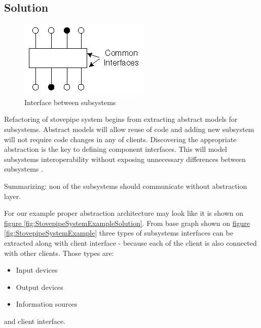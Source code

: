 \subsection{Solution}

\begin{figure}[!h]
    \centering
    \includegraphics[scale=1]{Images/CommonInterface.png}
    \caption[Interface between subsystems]{Interface between subsystems \cite{Solutions}}
    \label{fig:CommonInterface}
\end{figure}
Refactoring of stovepipe system begins from extracting abstract models for subsystems. Abstract models will allow reuse of code and adding new subsystem will not require code changes in any of clients. Discovering the appropriate abstraction is the key to defining component interfaces. This will model subsystems interoperability without exposing unnecessary differences between subsystems \cite{Solutions}.

Summarizing: non of the subsystems should communicate without abstraction layer.

\newpage

For our example proper abstraction architecture may look like it is shown on \hyperref[fig:StovepipeSystemExampleSolution]{figure \ref{fig:StovepipeSystemExampleSolution}}.
From base graph shown on \hyperref[fig:StovepipeSystemExample]{figure \ref{fig:StovepipeSystemExample}} three types of subsystems interfaces can be extracted along with client interface - because each of the client is also connected with other clients. Those types are:
\begin{itemize}
\item Input devices
\item Output devices
\item Information sources
\end{itemize}
and client interface.

